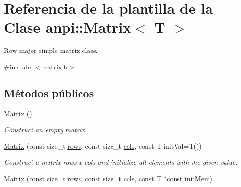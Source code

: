 \hypertarget{classanpi_1_1Matrix}{}\section{Referencia de la plantilla de la Clase anpi\+:\+:Matrix$<$ T $>$}
\label{classanpi_1_1Matrix}


Row-\/major simple matrix class.  




{\ttfamily \#include $<$matrix.\+h$>$}

\subsection*{Métodos públicos}
\begin{DoxyCompactItemize}
\item 
\hyperlink{classanpi_1_1Matrix_a378f41ca6eba448d5aabbbbafc9110cf}{Matrix} ()\hypertarget{classanpi_1_1Matrix_a378f41ca6eba448d5aabbbbafc9110cf}{}\label{classanpi_1_1Matrix_a378f41ca6eba448d5aabbbbafc9110cf}

\begin{DoxyCompactList}\small\item\em Construct an empty matrix. \end{DoxyCompactList}\item 
\hyperlink{classanpi_1_1Matrix_a7e948c79bd875197a3850e03efc8bd5f}{Matrix} (const size\+\_\+t \hyperlink{classanpi_1_1Matrix_a4b786272497d9f67f120a226c1bfcff4}{rows}, const size\+\_\+t \hyperlink{classanpi_1_1Matrix_a5bd9f2fe255fe0390bfe880877222b2a}{cols}, const T init\+Val=T())\hypertarget{classanpi_1_1Matrix_a7e948c79bd875197a3850e03efc8bd5f}{}\label{classanpi_1_1Matrix_a7e948c79bd875197a3850e03efc8bd5f}

\begin{DoxyCompactList}\small\item\em Construct a matrix rows x cols and initialize all elements with the given value. \end{DoxyCompactList}\item 
\hyperlink{classanpi_1_1Matrix_a3c37c93a58cbb831863ad3ad9dc73af6}{Matrix} (const size\+\_\+t \hyperlink{classanpi_1_1Matrix_a4b786272497d9f67f120a226c1bfcff4}{rows}, const size\+\_\+t \hyperlink{classanpi_1_1Matrix_a5bd9f2fe255fe0390bfe880877222b2a}{cols}, const T $\ast$const init\+Mem)\hypertarget{classanpi_1_1Matrix_a3c37c93a58cbb831863ad3ad9dc73af6}{}\label{classanpi_1_1Matrix_a3c37c93a58cbb831863ad3ad9dc73af6}


\end{DoxyCompactItemize}
